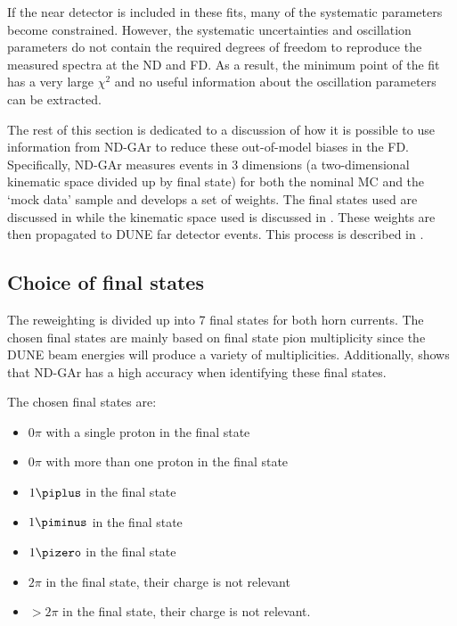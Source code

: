 If the near detector is included in these fits, many of the systematic parameters become constrained. 
However, the systematic uncertainties and oscillation parameters do not contain the required degrees of freedom to reproduce the measured spectra at the ND and FD. 
As a result, the minimum point of the fit has a very large $\chi^{2}$ and no useful information about the oscillation parameters can be extracted.

The rest of this section is dedicated to a discussion of how it is possible to use information from ND-GAr to reduce these out-of-model biases in the FD.
Specifically, ND-GAr measures events in 3 dimensions (a two-dimensional kinematic space divided up by final state) for both the nominal MC and the `mock data' sample and develops a set of weights.
The final states used are discussed in  while the kinematic space used is discussed in .
These weights are then propagated to DUNE far detector events. 
This process is described in .

\subsection{Choice of final states}
\label{sec:dune_ndrwt:rwt:states}

The reweighting is divided up into 7 final states for both horn currents.
The chosen final states are mainly based on final state pion multiplicity since the DUNE beam energies will produce a variety of multiplicities.
Additionally,  shows that ND-GAr has a high accuracy when identifying these final states.

The chosen final states are:
\begin{itemize}
	\item $0\pi$ with a single proton in the final state
	\item $0\pi$ with more than one proton in the final state
	\item $1\piplus$ in the final state
	\item $1\piminus$ in the final state
	\item $1\pizero$ in the final state
	\item $2\pi$ in the final state, their charge is not relevant
	\item $>2\pi$ in the final state, their charge is not relevant.
\end{itemize}


